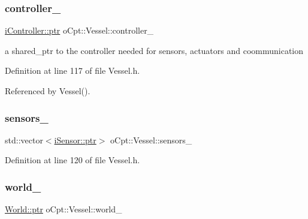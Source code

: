 \subsubsection{\texorpdfstring{controller\+\_\+}{controller\_}}
{\footnotesize\ttfamily \hyperlink{classo_cpt_1_1i_controller_a6d89a95cd6ad68bb74adfaca2f36370f}{i\+Controller\+::ptr} o\+Cpt\+::\+Vessel\+::controller\+\_\+\hspace{0.3cm}{\ttfamily [protected]}}



a shared\+\_\+ptr to the controller needed for sensors, actuators and coommunication 



Definition at line 117 of file Vessel.\+h.



Referenced by Vessel().

\hypertarget{classo_cpt_1_1_vessel_a7d34053ac8f878e6eeaab2567005c6d5}{}\label{classo_cpt_1_1_vessel_a7d34053ac8f878e6eeaab2567005c6d5} 
\subsubsection{\texorpdfstring{sensors\+\_\+}{sensors\_}}
{\footnotesize\ttfamily std\+::vector$<$\hyperlink{classo_cpt_1_1i_sensor_a03533d2c5dc66e332d70dbb3b5e3006a}{i\+Sensor\+::ptr}$>$ o\+Cpt\+::\+Vessel\+::sensors\+\_\+\hspace{0.3cm}{\ttfamily [protected]}}



Definition at line 120 of file Vessel.\+h.

\hypertarget{classo_cpt_1_1_vessel_a332359ea0b37185d1b6e8acc6f50546a}{}\label{classo_cpt_1_1_vessel_a332359ea0b37185d1b6e8acc6f50546a} 
\subsubsection{\texorpdfstring{world\+\_\+}{world\_}}
{\footnotesize\ttfamily \hyperlink{classo_cpt_1_1_world_aa6e591e3096d5de71e0cec9039663d67}{World\+::ptr} o\+Cpt\+::\+Vessel\+::world\+\_\+\hspace{0.3cm}{\ttfamily [protected]}}



